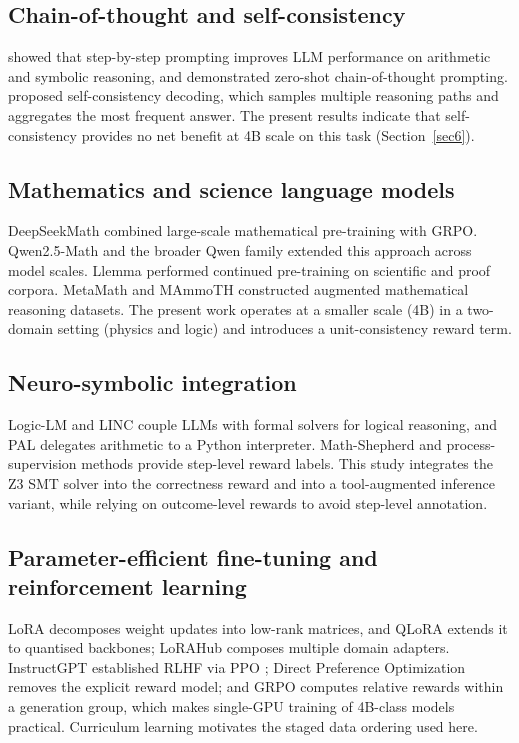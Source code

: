 \documentclass[APA,twocolumn]{USG}
\begin{document}
\subsection{Chain-of-thought and self-consistency}
\citet{Wei2022} showed that step-by-step prompting improves LLM performance on
arithmetic and symbolic reasoning, and \citet{Kojima2022} demonstrated
zero-shot chain-of-thought prompting. \citet{Wang2023sc} proposed
self-consistency decoding, which samples multiple reasoning paths and aggregates
the most frequent answer. The present results indicate that self-consistency
provides no net benefit at 4B scale on this task (Section~\ref{sec6}).

\subsection{Mathematics and science language models}
DeepSeekMath \citep{Shao2024} combined large-scale mathematical pre-training
with GRPO. Qwen2.5-Math \citep{Yang2024} and the broader Qwen family
\citep{Qwen2025} extended this approach across model scales. Llemma
\citep{Azerbayev2024} performed continued pre-training on scientific and proof
corpora. MetaMath \citep{Yu2023} and MAmmoTH \citep{Yue2023} constructed
augmented mathematical reasoning datasets. The present work operates at a
smaller scale (4B) in a two-domain setting (physics and logic) and introduces a
unit-consistency reward term.

\subsection{Neuro-symbolic integration}
Logic-LM \citep{Pan2023} and LINC \citep{Olausson2023} couple LLMs with formal
solvers for logical reasoning, and PAL \citep{Gao2022} delegates arithmetic to a
Python interpreter. Math-Shepherd \citep{Wang2024mathshepherd} and
process-supervision methods \citep{Lightman2023} provide step-level reward
labels. This study integrates the Z3 SMT solver into the correctness reward and
into a tool-augmented inference variant, while relying on outcome-level rewards
to avoid step-level annotation.

\subsection{Parameter-efficient fine-tuning and reinforcement learning}
LoRA \citep{Hu2022} decomposes weight updates into low-rank matrices, and QLoRA
\citep{Dettmers2023} extends it to quantised backbones; LoRAHub
\citep{Huang2023} composes multiple domain adapters. InstructGPT
\citep{Ouyang2022} established RLHF via PPO \citep{Schulman2017}; Direct
Preference Optimization \citep{Rafailov2023} removes the explicit reward model;
and GRPO \citep{Shao2024} computes relative rewards within a generation group,
which makes single-GPU training of 4B-class models practical. Curriculum
learning \citep{Bengio2009} motivates the staged data ordering used here.
\end{document}
